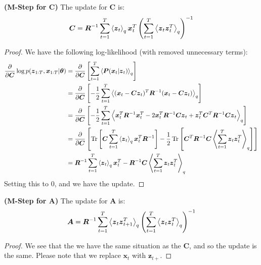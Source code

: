 \begin{proposition}{\textbf{(M-Step for $\boldsymbol C$)}}
    The update for $\boldsymbol C$ is:
    \begin{equation*}
        \boldsymbol C = \boldsymbol R^{-1}\sum^T_{t=1}\left\langle \boldsymbol z_t \right\rangle_q\boldsymbol x^T_t \left( \sum^T_{t=1}\left\langle \boldsymbol z_t\boldsymbol z_t^T \right\rangle_q \right)^{-1}
    \end{equation*}
\end{proposition}
\begin{proof}
    We have the following log-likelihood (with removed unnecessary terms):
    \begin{equation*}
    \begin{aligned}
        \frac{\partial}{\partial \boldsymbol C}\log p(\boldsymbol z_{1:T}, \boldsymbol x_{1:T} | \boldsymbol \theta) &= \frac{\partial}{\partial \boldsymbol C}\left[ \sum^T_{t=1}\left\langle \boldsymbol P(\boldsymbol x_t|\boldsymbol z_t) \right\rangle_{q} \right] \\
        &= \frac{\partial}{\partial \boldsymbol C}\left[ -\frac{1}{2}\sum^T_{t=1} \left\langle (\boldsymbol x_t - \boldsymbol C\boldsymbol z_t)^T\boldsymbol R^{-1}( \boldsymbol x_t - \boldsymbol C\boldsymbol z_t ) \right\rangle_q   \right] \\
        &= \frac{\partial}{\partial \boldsymbol C}\left[ -\frac{1}{2}\sum^T_{t=1} \left\langle \boldsymbol x^T_t\boldsymbol R^{-1}\boldsymbol x^T_t - 2\boldsymbol x^T_t\boldsymbol R^{-1}\boldsymbol C\boldsymbol z_t + \boldsymbol z_t^T\boldsymbol C^T\boldsymbol R^{-1}\boldsymbol C\boldsymbol z_t \right\rangle_q   \right]\\
        &= \frac{\partial}{\partial \boldsymbol C}\left[ \operatorname{Tr}\left[ \boldsymbol C\sum^T_{t=1}\left\langle \boldsymbol z_t \right\rangle_q\boldsymbol x^T_t\boldsymbol R^{-1} \right] - \frac{1}{2}\operatorname{Tr}\left[  \boldsymbol C^T\boldsymbol R^{-1}\boldsymbol C\left\langle \sum^T_{t=1}\boldsymbol z_t\boldsymbol z_t^T \right\rangle_q \right]   \right] \\
        &= \boldsymbol R^{-1}\sum^T_{t=1}\left\langle \boldsymbol z_t \right\rangle_q\boldsymbol x^T_t - \boldsymbol R^{-1}\boldsymbol C\left\langle \sum^T_{t=1}\boldsymbol z_t\boldsymbol z_t^T \right\rangle_q
    \end{aligned}
    \end{equation*}
    Setting this to $0$, and we have the update. 
\end{proof}

\begin{proposition}{\textbf{(M-Step for $\boldsymbol A$)}}
    The update for $\boldsymbol A$ is:
    \begin{equation*}
        \boldsymbol A = \boldsymbol R^{-1}\sum^T_{t=1}\left\langle \boldsymbol z_t\boldsymbol z^T_{t+1} \right\rangle_q \left( \sum^T_{t=1}\left\langle \boldsymbol z_t\boldsymbol z_t^T \right\rangle_q \right)^{-1}
    \end{equation*}
\end{proposition}
\begin{proof}
    We see that the we have the same situation as the $\boldsymbol C$, and so the update is the same. Please note that we replace $\boldsymbol x_t$ with $\boldsymbol z_{t+}$.
\end{proof}

